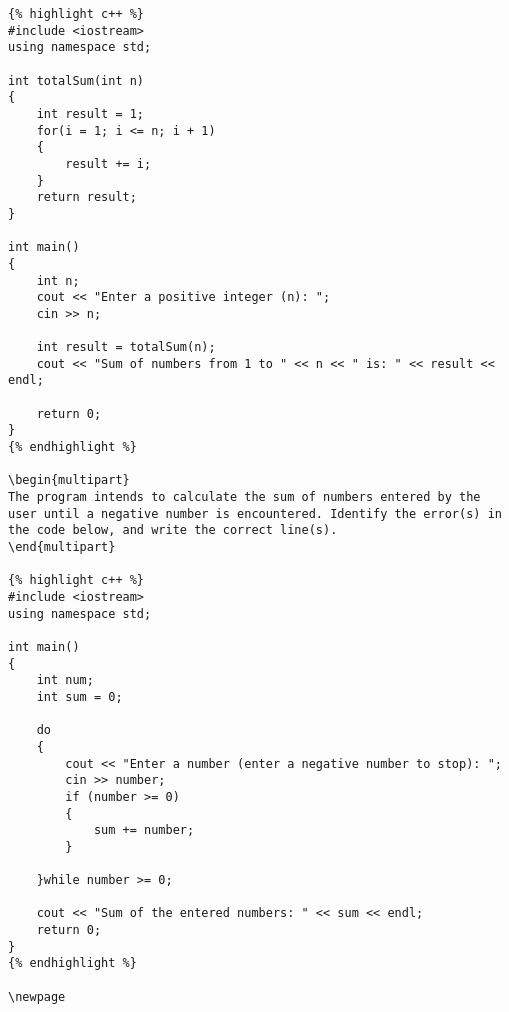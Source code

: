\begin{problem}
\begin{verbatim}
{% highlight c++ %}
#include <iostream>
using namespace std;

int totalSum(int n)
{
    int result = 1;
    for(i = 1; i <= n; i + 1)
    {
        result += i;
    }
    return result;
}

int main() 
{
    int n;
    cout << "Enter a positive integer (n): ";
    cin >> n;

    int result = totalSum(n);
    cout << "Sum of numbers from 1 to " << n << " is: " << result << endl;

    return 0;
}
{% endhighlight %}

\begin{multipart}
The program intends to calculate the sum of numbers entered by the user until a negative number is encountered. Identify the error(s) in the code below, and write the correct line(s).
\end{multipart}

{% highlight c++ %}
#include <iostream>
using namespace std;

int main() 
{
    int num;
    int sum = 0;

    do 
    {
        cout << "Enter a number (enter a negative number to stop): ";
        cin >> number;
        if (number >= 0) 
        {
            sum += number;
        }

    }while number >= 0;

    cout << "Sum of the entered numbers: " << sum << endl;
    return 0;
}
{% endhighlight %}

\newpage 


\end{verbatim}
\end{problem}
